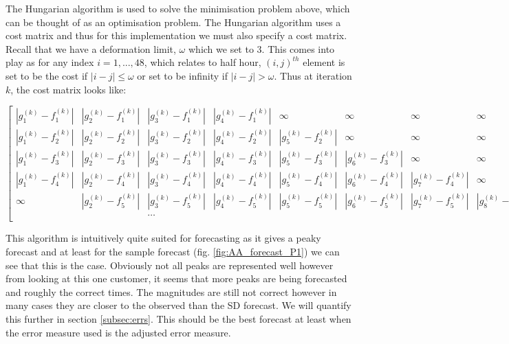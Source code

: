 The Hungarian algorithm is used to solve the minimisation problem above, which can be thought of as an optimisation problem. The Hungarian algorithm uses a cost matrix and thus for this implementation we must also specify a cost matrix. Recall that we have a deformation limit, $\omega$ which we set to 3. This comes into play as for any index $i = 1, ..., 48$, which relates to half hour, $(i,j)^{th}$ element is set to be the cost if $|i-j|\le\omega$ or set to be infinity if $|i-j| > \omega$. Thus at iteration $k$, the cost matrix looks like: \newline

\centerline{$\begin{bmatrix}
    |g_1^{(k)} - f_1^{(k)}| & |g_2^{(k)} - f_1^{(k)}| & |g_3^{(k)} - f_1^{(k)}| & |g_4^{(k)} -f_1^{(k)}| & \infty  & \infty& \infty & \infty & \dots & \infty \\
    |g_1^{(k)} - f_2^{(k)}| & |g_2^{(k)} - f_2^{(k)}| & |g_3^{(k)} - f_2^{(k)}| &  |g_4^{(k)} - f_2^{(k)}| & |g_5^{(k)} - f_2^{(k)}| & \infty & \infty &\infty & \dots & \infty\\
    |g_1^{(k)} - f_3^{(k)}| & |g_2^{(k)} - f_3^{(k)}| & |g_3^{(k)} - f_3^{(k)}| &  |g_4^{(k)} - f_3^{(k)}|& |g_5^{(k)}- f_3^{(k)}| & |g_6^{(k)}-f_3^{(k)}| & \infty & \infty & \dots  & \infty\\
    |g_1^{(k)}-f_4^{(k)}| & |g_2^{(k)} - f_4^{(k)}| & |g_3^{(k)} - f_4^{(k)}| & |g_4^{(k)} - f_4^{(k)}| &  |g_5^{(k)} - f_4^{(k)}| & |g_6^{(k)}- f_4^{(k)}|& |g_7^{(k)} - f_4^{(k)}| &\infty &\dots & \infty\\
    \infty & |g_2^{(k)} - f_5^{(k)}| & |g_3^{(k)} - f_5^{(k)}| & |g_4^{(k)} - f_5^{(k)}| &  |g_5^{(k)} - f_5^{(k)}|& |g_6^{(k)}- f_5^{(k)}|& |g_7^{(k)} - f_5^{(k)}| &|g_8^{(k)} - f_5^{(k)}| &\dots & \infty\\
     &  & \dots &  & &  & &  & \\
\end{bmatrix}$}

This algorithm is intuitively quite suited for forecasting as it gives a peaky forecast and at least for the sample forecast (fig. \ref{fig:AA_forecast_P1}) we can see that this is the case. Obviously not all peaks are represented well however from looking at this one customer, it seems that more peaks are being forecasted and roughly the correct times. The magnitudes are still not correct however in many cases they are closer to the observed than the SD forecast. We will quantify this further in section \ref{subsec:errs}. This should be the best forecast at least when the error measure used is the adjusted error measure.

